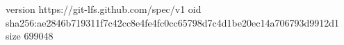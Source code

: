 version https://git-lfs.github.com/spec/v1
oid sha256:ae2846b719311f7c42cc8e4fe4fc0cc65798d7c4d1be20ec14a706793d9912d1
size 699048
